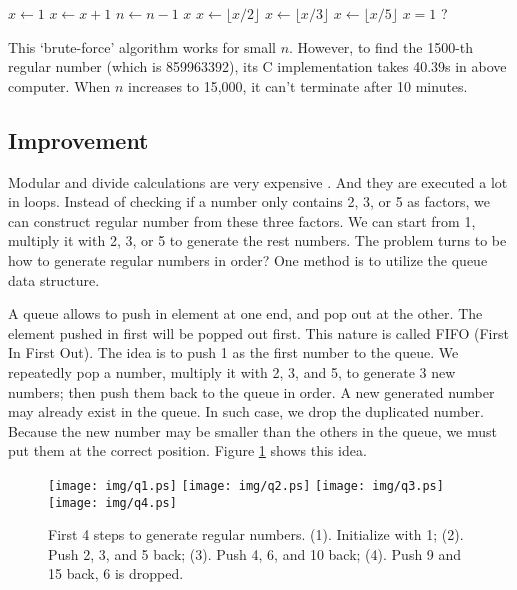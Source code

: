 \documentclass[b5paper]{article}
\begin{document}
\begin{algorithmic}[1]
  \State $x \gets 1$
    \State $x \gets x + 1$
      \State $n \gets n - 1$
    \EndIf
  \EndWhile
  \State \Return $x$
\EndFunction
\Statex
{}
    \State $x \gets \lfloor x / 2 \rfloor$
  \EndWhile
    \State $x \gets \lfloor x / 3 \rfloor$
  \EndWhile
    \State $x \gets \lfloor x / 5 \rfloor$
  \EndWhile
  \State \Return $x = 1$ ?
\EndFunction
\end{algorithmic}

This `brute-force' algorithm works for small $n$. However, to find the 1500-th regular number (which is 859963392), its C implementation takes 40.39s in above computer. When $n$ increases to 15,000, it can't terminate after 10 minutes.

\subsection{Improvement}
Modular and divide calculations are very expensive \cite{Bentley}. And they are executed a lot in loops. Instead of checking if a number only contains 2, 3, or 5 as factors, we can construct regular number from these three factors. We can start from 1, multiply it with 2, 3, or 5 to generate the rest numbers. The problem turns to be how to generate regular numbers in order? One method is to utilize the queue data structure.

A queue allows to push in element at one end, and pop out at the other. The element pushed in first will be popped out first. This nature is called FIFO (First In First Out). The idea is to push 1 as the first number to the queue. We repeatedly pop a number, multiply it with 2, 3, and 5, to generate 3 new numbers; then push them back to the queue in order. A new generated number may already exist in the queue. In such case, we drop the duplicated number. Because the new number may be smaller than the others in the queue, we must put them at the correct position. Figure \ref{fig:queues} shows this idea.

\begin{figure}[htbp]
  \centering
  \texttt{[image: img/q1.ps]}
  \texttt{[image: img/q2.ps]}
  \texttt{[image: img/q3.ps]}
  \texttt{[image: img/q4.ps]}
  \caption{First 4 steps to generate regular numbers. (1). Initialize with 1; (2). Push 2, 3, and 5 back; (3). Push 4, 6, and 10 back; (4). Push 9 and 15 back, 6 is dropped.}
  \label{fig:queues}
\end{figure}
\end{document}
